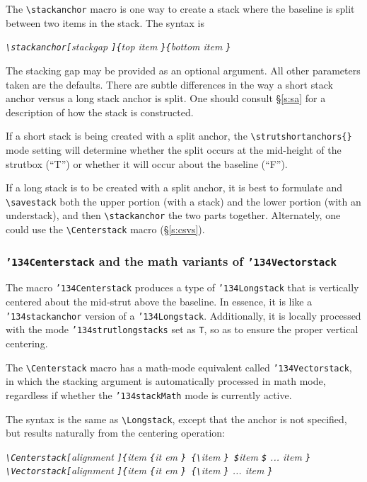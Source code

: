 \documentclass{article}
\let\vb\verb
\newcommand\cmd[1]{\texttt{\char'134#1}}
\begin{document}
The \vb|\stackanchor| macro is one way to create a stack where the
baseline is split between two items in the stack.  The syntax is

\itshape
\vb|\stackanchor[|stackgap%
  \vb|]{|top item%
  \vb|}{|bottom item%
  \vb|}|
\upshape

The stacking gap may be provided as an optional argument.  All other
parameters taken are the defaults.  There are subtle differences in the
way a short stack anchor versus a long stack anchor is split.
One should consult \S\ref{s:sa} for a description of how the
stack is constructed.

If a short stack is being created with a split anchor, the
\vb|\strutshortanchors{}| mode setting will determine whether the split 
occurs at the mid-height of the strutbox (``T'') or whether it will 
occur about the baseline (``F'').

If a long stack is to be created with a split anchor, it is best to
formulate and \vb|\savestack| both the upper portion (with a stack)
and the lower portion (with an understack), and then \vb|\stackanchor|
the two parts together.  Alternately, one could use the 
\vb|\Centerstack| macro (\S\ref{s:csvs}).

\subsubsection{\cmd{Centerstack} and the math variants of 
  \cmd{Vectorstack}\label{s:csvs}}

The macro \cmd{Centerstack} produces a type of \cmd{Longstack} that is 
vertically centered about the mid-strut above the baseline.  In essence, 
it is like a \cmd{stackanchor} version of a \cmd{Longstack}.  Additionally, 
it is locally processed with the mode \cmd{strutlongstacks} set as 
\verb|T|, so as to ensure
the proper vertical centering.  

The \vb|\Centerstack| macro has a math-mode equivalent called 
\cmd{Vectorstack}, in which the stacking argument 
is automatically processed in math mode, regardless if whether the \cmd{stackMath} 
mode is currently active.

The syntax is the same as \vb|\Longstack|, except that the anchor is
not specified, but results naturally from the centering operation:

\itshape
\vb|\Centerstack[|alignment%
  \vb|]{|item %
  \vb|{|it em%
  \vb|} {\|item%
  \vb|} $|item%
  \vb|$| ... item%
  \vb|}|\\
\vb|\Vectorstack[|alignment%
  \vb|]{|item %
  \vb|{|it em%
  \vb|} {\|item%
  \vb|}| ... item%
  \vb|}|
\upshape
\end{document}
